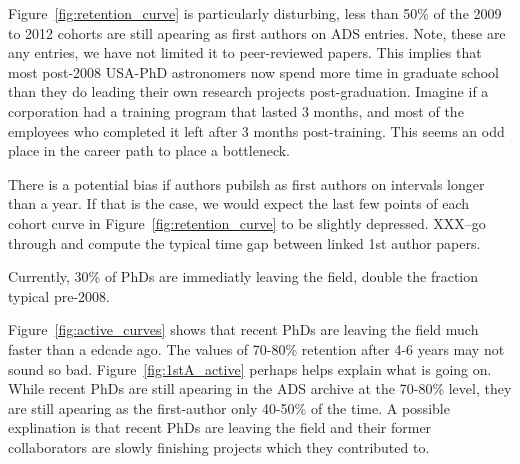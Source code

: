 \documentclass{emulateapj}
\begin{document}
Figure~\ref{fig:retention_curve} is particularly disturbing, less than 50\% of the 2009 to 2012 cohorts are still apearing as first authors on ADS entries. Note, these are any entries, we have not limited it to peer-reviewed papers.  This implies that most post-2008 USA-PhD astronomers now spend more time in graduate school than they do leading their own research projects post-graduation. Imagine if a corporation had a training program that lasted 3 months, and most of the employees who completed it left after 3 months post-training.  This seems an odd place in the career path to place a bottleneck.

There is a potential bias if authors pubilsh as first authors on intervals longer than a year.  If that is the case, we would expect the last few points of each cohort curve in Figure~\ref{fig:retention_curve} to be slightly depressed.  XXX--go through and compute the typical time gap between linked 1st author papers.  

Currently, 30\% of PhDs are immediatly leaving the field, double the fraction typical pre-2008.  





Figure~\ref{fig:active_curves} shows that recent PhDs are leaving the field much faster than a edcade ago.  The values of 70-80\% retention after 4-6 years may not sound so bad.  Figure~\ref{fig:1stA_active} perhaps helps explain what is going on. While recent PhDs are still apearing in the ADS archive at the 70-80\% level, they are still apearing as the first-author only 40-50\% of the time. A possible explination is that recent PhDs are leaving the field and their former collaborators are slowly finishing projects which they contributed to.
\end{document}
